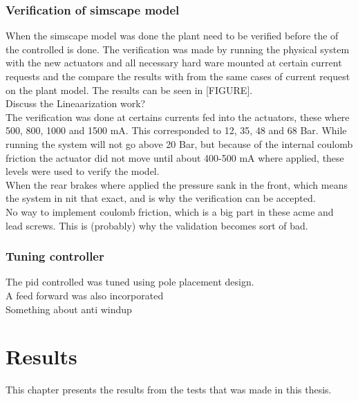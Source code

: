 \documentclass[a4paper,11pt]{kth-mag}
\begin{document}
\subsection{Verification of simscape model}
When the simscape model was done the plant need to be verified before the of the controlled is done. The verification was made by running the physical system with the new actuators and all necessary hard ware mounted at certain current requests and the compare the results with from the same cases of current request on the plant model. The results can be seen in [FIGURE]. \\

Discuss the Lineaarization work?\\

The verification was done at certains currents fed into the actuators, these where 500, 800, 1000 and 1500 mA. This corresponded to 12, 35, 48 and 68 Bar. While running the system will not go above 20 Bar, but because of the internal coulomb friction the actuator did not move until about 400-500 mA where applied, these levels were used to verify the model.\\

When the rear brakes where applied the pressure sank in the front, which means the system in nit that exact, and is why the verification can be accepted. \\

No way to implement coulomb friction, which is a big part in these acme and lead screws. This is (probably) why the validation becomes sort of bad.\\



\subsection{Tuning controller}
The \gls{pid} controlled was tuned using pole placement design. \\

A feed forward was also incorporated\\

Something about anti windup\\



\chapter{Results}
This chapter presents the results from the tests that was made in this thesis.
\end{document}
